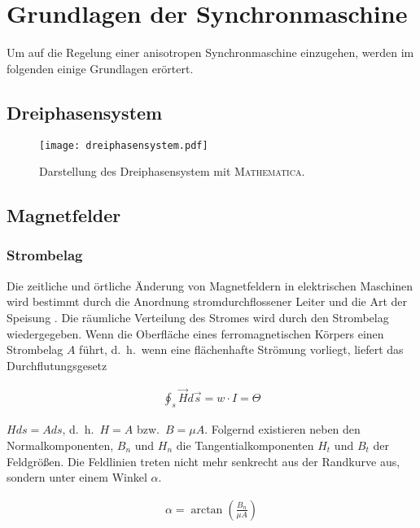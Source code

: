 \chapter{Grundlagen der Synchronmaschine}\label{cha:grundlagen}

Um auf die Regelung einer anisotropen Synchronmaschine einzugehen, werden im folgenden einige Grundlagen erörtert.

\section{Dreiphasensystem}\label{sec:dreiphasensystem}

\begin{figure}[h]
\centering
\texttt{[image: dreiphasensystem.pdf]}
\label{fig:dreiphasensystem}
\caption{Darstellung des Dreiphasensystem mit \textsc{Mathematica}.}
\end{figure}

\section{Magnetfelder}\label{sec:magnetfelder}

\subsection{Strombelag}\label{sec:strombelag}

Die zeitliche und örtliche Änderung von Magnetfeldern in elektrischen Maschinen wird bestimmt durch die Anordnung stromdurchflossener Leiter und die Art der Speisung \parencite[S.~199]{hofmann2013}.
Die räumliche Verteilung des Stromes wird durch den Strombelag wiedergegeben.
Wenn die Oberfläche eines ferromagnetischen Körpers einen Strombelag $A$ führt, d.\ h.\ wenn eine flächenhafte Strömung vorliegt, liefert das Durchflutungsgesetz

\begin{align}
\oint_{s}{\vec{H}d\vec{s}} = w\cdot I = \Theta \label{durchflutungsgesetz}
\end{align}

$Hds=Ads$, d.\ h.\ $H = A$ bzw.\ $B = \mu A$.
Folgernd existieren neben den Normalkomponenten, $B_n$ und $H_n$ die Tangentialkomponenten $H_t$ und $B_t$ der Feldgrößen.
Die Feldlinien treten nicht mehr senkrecht aus der Randkurve aus, sondern unter einem Winkel $\alpha$.

\begin{align}
\alpha = \arctan(\frac{B_n}{\mu A}) \label{strombelagwinkel}
\end{align}

